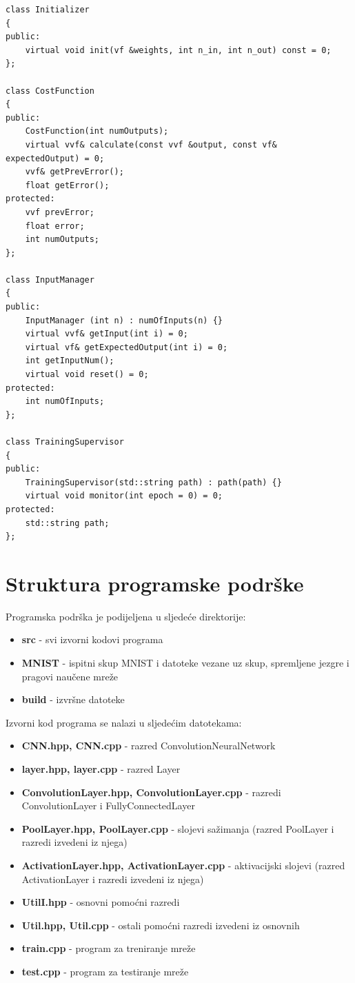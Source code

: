 \documentclass[times, utf8, zavrsni, numeric]{fer}
\begin{document}
\begin{lstlisting}[caption=Pomoćni razredi,
  label=util]
class Initializer
{
public:
    virtual void init(vf &weights, int n_in, int n_out) const = 0;
};

class CostFunction
{
public:
    CostFunction(int numOutputs);
    virtual vvf& calculate(const vvf &output, const vf& expectedOutput) = 0;
    vvf& getPrevError();
    float getError();
protected:
    vvf prevError;
    float error;
    int numOutputs;
};

class InputManager
{
public:
    InputManager (int n) : numOfInputs(n) {}
    virtual vvf& getInput(int i) = 0;
    virtual vf& getExpectedOutput(int i) = 0;
    int getInputNum();
    virtual void reset() = 0;
protected:
    int numOfInputs;
};

class TrainingSupervisor
{
public:
    TrainingSupervisor(std::string path) : path(path) {}
    virtual void monitor(int epoch = 0) = 0;
protected:
    std::string path;
};
\end{lstlisting}

\section{Struktura programske podrške}
Programska podrška je podijeljena u sljedeće direktorije:
\begin{itemize}
\item \textbf{src} - svi izvorni kodovi programa
\item \textbf{MNIST} - ispitni skup MNIST i datoteke vezane uz skup, spremljene jezgre i pragovi naučene mreže
\item \textbf{build} - izvršne datoteke
\end{itemize}

Izvorni kod programa se nalazi u sljedećim datotekama:
\begin{itemize}
\item \textbf{CNN.hpp, CNN.cpp} - razred ConvolutionNeuralNetwork
\item \textbf{layer.hpp, layer.cpp} - razred Layer
\item \textbf{ConvolutionLayer.hpp, ConvolutionLayer.cpp} - razredi ConvolutionLayer i FullyConnectedLayer
\item \textbf{PoolLayer.hpp, PoolLayer.cpp} - slojevi sažimanja (razred PoolLayer i razredi izvedeni iz njega)
\item \textbf{ActivationLayer.hpp, ActivationLayer.cpp} - aktivacijski slojevi (razred ActivationLayer i razredi izvedeni iz njega)
\item \textbf{UtilI.hpp} - osnovni pomoćni razredi
\item \textbf{Util.hpp, Util.cpp} - ostali pomoćni razredi izvedeni iz osnovnih
\item \textbf{train.cpp} - program za treniranje mreže
\item \textbf{test.cpp} - program za testiranje mreže
\end{itemize}
\end{document}
